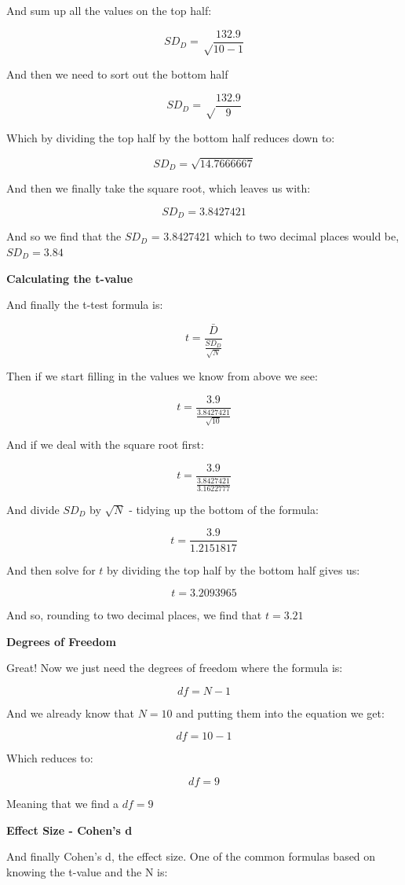 \documentclass[
  oneside]{book}
\begin{document}
And sum up all the values on the top half:

\[SD_{D} =\sqrt\frac{132.9}{10 - 1}\]

And then we need to sort out the bottom half

\[SD_{D} =\sqrt\frac{132.9}{9}\]

Which by dividing the top half by the bottom half reduces down to:

\[SD_{D} =\sqrt{14.7666667}\]

And then we finally take the square root, which leaves us with:

\[SD_{D} =3.8427421\]

And so we find that the \(SD_{D}\) = 3.8427421 which to two decimal places would be, \(SD_{D} = 3.84\)

\textbf{Calculating the t-value}

And finally the t-test formula is:

\[t = \frac{\bar{D}}{\frac{SD_{D}}{\sqrt{N}}}\]

Then if we start filling in the values we know from above we see:

\[t = \frac{3.9}{\frac{3.8427421}{\sqrt{10}}} \]

And if we deal with the square root first:

\[t = \frac{3.9}{\frac{3.8427421}{3.1622777}} \]

And divide \(SD_{D}\) by \(\sqrt{N}\) - tidying up the bottom of the formula:

\[t = \frac{3.9}{1.2151817} \]

And then solve for \(t\) by dividing the top half by the bottom half gives us:

\[t = 3.2093965 \]

And so, rounding to two decimal places, we find that \(t = 3.21\)

\textbf{Degrees of Freedom}

Great! Now we just need the degrees of freedom where the formula is:

\[df = N - 1\]

And we already know that \(N= 10\) and putting them into the equation we get:

\[df = 10 - 1\]

Which reduces to:

\[df = 9\]

Meaning that we find a \(df = 9\)

\textbf{Effect Size - Cohen's d}

And finally Cohen's d, the effect size. One of the common formulas based on knowing the t-value and the N is:
\end{document}
